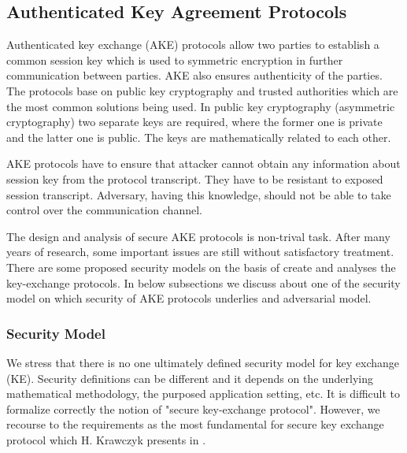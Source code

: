 \documentclass[11pt,titlepage]{article}
\theoremstyle{plain}
\begin{document}
\subsection{Authenticated Key Agreement Protocols}
Authenticated key exchange (AKE) protocols allow two parties to establish a common session key which is used to symmetric encryption in further communication between parties. AKE also ensures authenticity of the parties. The protocols base on public key cryptography and trusted authorities which are the most common solutions being used. In public key cryptography (asymmetric cryptography) two separate keys are required, where the former one is private and the latter one is public. The keys are mathematically related to each other.

\vspace{5mm}

AKE protocols have to ensure that attacker cannot obtain any information about session key from the protocol transcript. They have to be resistant to exposed session transcript. Adversary, having this knowledge, should not be able to take control over the communication channel.

\vspace{5mm}

The design and analysis of secure AKE protocols is non-trival task. After many years of research, some important issues are still without satisfactory treatment. There are some proposed security models on the basis of create and analyses the key-exchange protocols. In below subsections we discuss about one of the security model on which security of AKE protocols underlies and adversarial model.

\subsubsection{Security Model}
We stress that there is no one ultimately defined security model for key exchange (KE). Security definitions can be different and it depends on the underlying mathematical methodology, the purposed application setting, etc. It is difficult to formalize correctly the notion of "secure key-exchange protocol". However, we recourse to the requirements as the most fundamental for secure key exchange protocol which H. Krawczyk presents in \cite{sign_mac}. 
\end{document}
